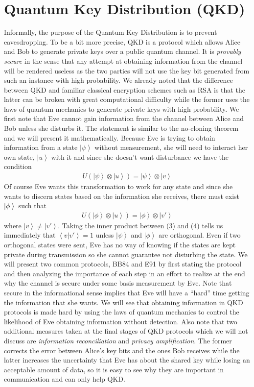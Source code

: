 \documentclass[aps,prd,final,twocolumn,letterpaper]{revtex4}
\newcommand{\ket}[1]{\left|#1\right\rangle}
\newcommand{\braket}[2]{\left\langle#1 |  #2\right\rangle}
\begin{document}
\section{Quantum Key Distribution (QKD)}
Informally, the purpose of the Quantum Key Distribution is to prevent eavesdropping. To be a bit more precise, QKD is a protocol which allows Alice and Bob to generate private keys over a public quantum channel. It is \emph{provably secure} in the sense that any attempt at obtaining information from the channel will be rendered useless as the two parties will not use the key bit generated from such an instance with high probability. We already noted that the difference between QKD and familiar classical encryption schemes such as RSA is that the latter can be broken with great computational difficulty while the former uses the laws of quantum mechanics to generate private keys with high probability. We first note that Eve cannot gain information from the channel between  Alice and Bob unless she disturbs it. The statement is similar to the no-cloning theorem and we will present it mathematically. Because Eve is trying to obtain information from a state $\ket{\psi}$ without measurement, she will need to interact her own state, $\ket{u}$ with it and since she doesn't want disturbance we have the condition 
\begin{align}
U(\ket{\psi}\otimes\ket{u})=\ket{\psi}\otimes\ket{v} 
\end{align}
Of course Eve wants this transformation to work for any state and since she wants to discern states based on the information she receives, there must exist $\ket{\phi}$ such that \begin{align}
U(\ket{\phi}\otimes\ket{u})=\ket{\phi}\otimes\ket{v'}
\end{align} 
where $\ket{v}\neq \ket{v'}$. Taking the inner product between (3) and (4) tells us immediately that $\braket{v}{v'}=1$ unless $\ket{\psi}$ and $\ket{\phi}$ are orthogonal. Even if two orthogonal states were sent, Eve has no way of knowing if the states are kept private during transmission so she cannot guarantee not disturbing the state. We will present two common protocols, BB84 and E91 by first stating the protocol and then analyzing the importance of each step in an effort to realize at the end why the channel is secure under some basis measurement by Eve. Note that secure in the informational sense implies that Eve will have a ``hard'' time getting the information that she wants. We will see that obtaining information in QKD protocols is made hard by using the laws of quantum mechanics to control the likelihood of Eve obtaining information without detection. Also note that two additional measures taken at the final stages of QKD protocols which we will not discuss are \emph{information reconciliation} and \emph{privacy amplification}. The former corrects the error between Alice's key bits and the ones Bob receives while the latter increases the uncertainty that Eve has about the shared key while losing an acceptable amount of data, so it is easy to see why they are important in communication and can only help QKD.
\end{document}
